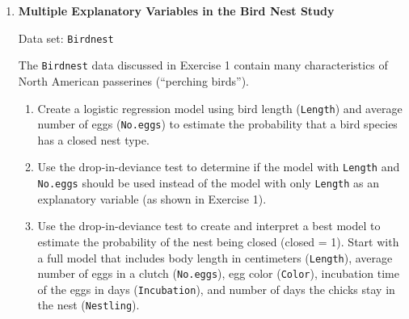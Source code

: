 \documentclass[
]{report}
\begin{document}
\begin{enumerate}
  \begin{enumerate}
    \item Create a logistic regression model using area to estimate the probability of survival.
    \item Calculate the observed and expected probabilities. Plot both of these probabilities against the median area.
    \item Interpret the model in terms of the odds ratio. Use the Wald statistic to create a 95\% confidence interval for the odds ratio.
    \item Test $\scriptstyle H_0$: $\scriptstyle \beta_1$ = 0 versus $\scriptstyle H_a$: $\scriptstyle \beta_1 \ \ne$ 0 using both Wald’s test and the likelihood ratio test. State your conclusion based on these tests.
    \item Conduct the Pearson, deviance, and Hosmer-Lemeshow goodness-of-fit tests to assess how well the model fits the data. Interpret the results.
    \item Report and interpret Somers’ $\scriptstyle D$, Goodman-Kruskal gamma, or Kendall’s tau-a for this logistic regression model.
    \item What conclusions can you draw from this study?
  \end{enumerate}

  \item \textbf{Multiple Explanatory Variables in the Bird Nest Study}

Data set: \texttt{Birdnest}

The \texttt{Birdnest} data discussed in Exercise 1 contain many characteristics of North American passerines (“perching birds”).

  \begin{enumerate}
    \item Create a logistic regression model using bird length (\texttt{Length}) and average number of eggs (\texttt{No.eggs}) to estimate the probability that a bird species has a closed nest type.
    \item Use the drop-in-deviance test to determine if the model with \texttt{Length} and \texttt{No.eggs} should be used instead of the model with only \texttt{Length} as an explanatory variable (as shown in Exercise 1).
    \item Use the drop-in-deviance test to create and interpret a best model to estimate the probability of the nest being closed (closed = 1). Start with a full model that includes body length in centimeters (\texttt{Length}), average number of eggs in a clutch (\texttt{No.eggs}), egg color (\texttt{Color}), incubation time of the eggs in days (\texttt{Incubation}), and number of days the chicks stay in the nest (\texttt{Nestling}).
  \end{enumerate}


\end{enumerate}
\end{document}

